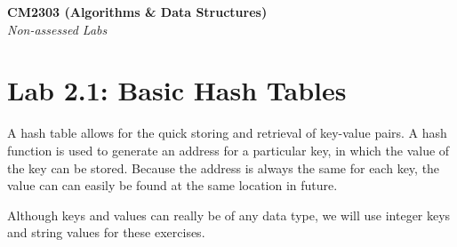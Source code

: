 \documentclass[11pt,a4paper]{report}
\begin{document}
\noindent\Large\textbf{CM2303 (Algorithms \& Data Structures)}\\
\noindent\large\textit{Non-assessed Labs}
\vskip30pt

\section*{Lab 2.1: Basic Hash Tables}

A hash table allows for the quick storing and retrieval of key-value pairs. A hash function is used to generate an address for a particular key, in which the value of the key can be stored. Because the address is always the same for each key, the value can can easily be found at the same location in future. 

Although keys and values can really be of any data type, we will use integer keys and string values for these exercises.
\end{document}
